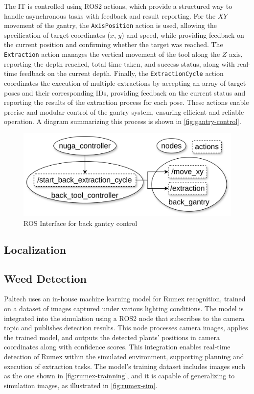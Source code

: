 The \ac{IT} is controlled using ROS$2$ actions, which provide a structured way to handle asynchronous tasks with feedback and result reporting. For the $XY$ movement of the gantry, the \texttt{AxisPosition} action is used, allowing the specification of target coordinates ($x$, $y$) and speed, while providing feedback on the current position and confirming whether the target was reached. The \texttt{Extraction} action manages the vertical movement of the tool along the $Z$ axis, reporting the depth reached, total time taken, and success status, along with real-time feedback on the current depth. Finally, the \texttt{ExtractionCycle} action coordinates the execution of multiple extractions by accepting an array of target poses and their corresponding IDs, providing feedback on the current status and reporting the results of the extraction process for each pose. These actions enable precise and modular control of the gantry system, ensuring efficient and reliable operation. A diagram summarizing this process is shown in \autoref{fig:gantry-control}.

\begin{figure}[h]
    \centering
    \includegraphics[width=0.7\linewidth]{gfx/ch02/gantry_control.png}
    \caption{ROS Interface for back gantry control}
    \label{fig:gantry-control}
\end{figure}


\subsection{Localization}
\lipsum[1]

\subsection{Weed Detection}
Paltech uses an in-house machine learning model for Rumex recognition, trained on a dataset of images captured under various lighting conditions. The model is integrated into the simulation using a ROS2 node that subscribes to the camera topic and publishes detection results. This node processes camera images, applies the trained model, and outputs the detected plants’ positions in camera coordinates along with confidence scores. This integration enables real-time detection of Rumex within the simulated environment, supporting planning and execution of extraction tasks. The model’s training dataset includes images such as the one shown in \autoref{fig:rumex-trainning}, and it is capable of generalizing to simulation images, as illustrated in \autoref{fig:rumex-sim}.

